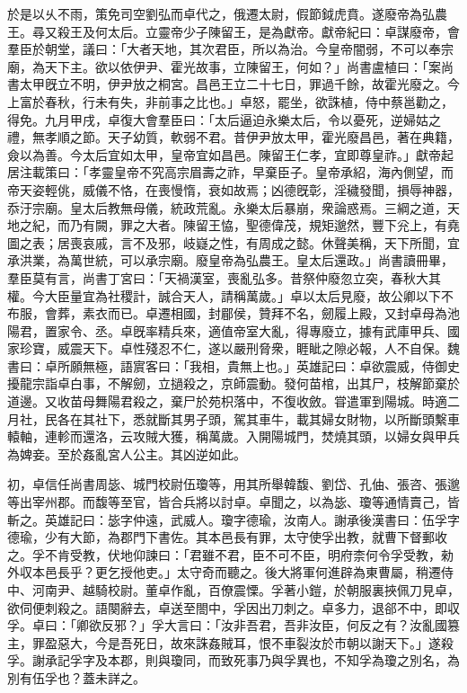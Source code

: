 \begin{pinyinscope}
於是以乆不雨，策免司空劉弘而卓代之，俄遷太尉，假節鉞虎賁。遂廢帝為弘農王。尋又殺王及何太后。立靈帝少子陳留王，是為獻帝。獻帝紀曰：卓謀廢帝，會羣臣於朝堂，議曰：「大者天地，其次君臣，所以為治。今皇帝闇弱，不可以奉宗廟，為天下主。欲以依伊尹、霍光故事，立陳留王，何如？」尚書盧植曰：「案尚書太甲旣立不明，伊尹放之桐宮。昌邑王立二十七日，罪過千餘，故霍光廢之。今上富於春秋，行未有失，非前事之比也。」卓怒，罷坐，欲誅植，侍中蔡邕勸之，得免。九月甲戌，卓復大會羣臣曰：「太后逼迫永樂太后，令以憂死，逆婦姑之禮，無孝順之節。天子幼質，軟弱不君。昔伊尹放太甲，霍光廢昌邑，著在典籍，僉以為善。今太后宜如太甲，皇帝宜如昌邑。陳留王仁孝，宜即尊皇祚。」獻帝起居注載策曰：「孝靈皇帝不究高宗眉壽之祚，早棄臣子。皇帝承紹，海內側望，而帝天姿輕佻，威儀不恪，在喪慢惰，衰如故焉；凶德旣彰，淫穢發聞，損辱神器，忝汙宗廟。皇太后教無母儀，統政荒亂。永樂太后暴崩，衆論惑焉。三綱之道，天地之紀，而乃有闕，罪之大者。陳留王恊，聖德偉茂，規矩邈然，豐下兊上，有堯圖之表；居喪哀戚，言不及邪，岐嶷之性，有周成之懿。休聲美稱，天下所聞，宜承洪業，為萬世統，可以承宗廟。廢皇帝為弘農王。皇太后還政。」尚書讀冊畢，羣臣莫有言，尚書丁宮曰：「天禍漢室，喪亂弘多。昔祭仲廢忽立突，春秋大其權。今大臣量宜為社稷計，誠合天人，請稱萬歲。」卓以太后見廢，故公卿以下不布服，會葬，素衣而已。卓遷相國，封郿侯，贊拜不名，劒履上殿，又封卓母為池陽君，置家令、丞。卓旣率精兵來，適值帝室大亂，得專廢立，據有武庫甲兵、國家珍寶，威震天下。卓性殘忍不仁，遂以嚴刑脅衆，睚眦之隙必報，人不自保。魏書曰：卓所願無極，語賔客曰：「我相，貴無上也。」英雄記曰：卓欲震威，侍御史擾龍宗詣卓白事，不解劒，立撾殺之，京師震動。發何苗棺，出其尸，枝解節棄於道邊。又收苗母舞陽君殺之，棄尸於苑枳落中，不復收斂。甞遣軍到陽城。時適二月社，民各在其社下，悉就斷其男子頭，駕其車牛，載其婦女財物，以所斷頭繫車轅軸，連軫而還洛，云攻賊大獲，稱萬歲。入開陽城門，焚燒其頭，以婦女與甲兵為婢妾。至於姦亂宮人公主。其凶逆如此。

初，卓信任尚書周毖、城門校尉伍瓊等，用其所舉韓馥、劉岱、孔伷、張咨、張邈等出宰州郡。而馥等至官，皆合兵將以討卓。卓聞之，以為毖、瓊等通情賣己，皆斬之。英雄記曰：毖字仲遠，武威人。瓊字德瑜，汝南人。謝承後漢書曰：伍孚字德瑜，少有大節，為郡門下書佐。其本邑長有罪，太守使孚出教，就曹下督郵收之。孚不肯受教，伏地仰諫曰：「君雖不君，臣不可不臣，明府柰何令孚受教，勑外収本邑長乎？更乞授他吏。」太守奇而聽之。後大將軍何進辟為東曹屬，稍遷侍中、河南尹、越騎校尉。董卓作亂，百僚震慄。孚著小鎧，於朝服裏挾佩刀見卓，欲伺便刺殺之。語闋辭去，卓送至閤中，孚因出刀刺之。卓多力，退郤不中，即収孚。卓曰：「卿欲反邪？」孚大言曰：「汝非吾君，吾非汝臣，何反之有？汝亂國篡主，罪盈惡大，今是吾死日，故來誅姦賊耳，恨不車裂汝於市朝以謝天下。」遂殺孚。謝承記孚字及本郡，則與瓊同，而致死事乃與孚異也，不知孚為瓊之別名，為別有伍孚也？蓋未詳之。


\end{pinyinscope}
